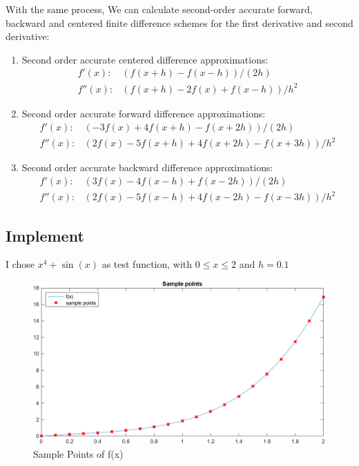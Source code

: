 \documentclass[
	12pt, %
]{fphw}
\numberwithin{equation}{section}
\numberwithin{figure}{section}
\numberwithin{table}{section}
\begin{document}
With the same process, We can calculate second-order accurate forward, backward and centered finite difference
schemes for the first derivative and second derivative:
\begin{enumerate}
	\item Second order accurate centered difference approximations:
	      \begin{equation}
		      \begin{aligned}
			      f' (x):  & (f (x+h)-f (x-h)) /(2 h)        \\
			      f'' (x): & (f (x+h)-2 f (x)+f (x-h)) / h^2
		      \end{aligned}
	      \end{equation}
	\item Second order accurate forward difference approximations:
	      \begin{equation}
		      \begin{aligned}
			      f' (x):  & (-3 f (x)+4 f (x+h)-f (x+2 h)) / (2 h)          \\
			      f'' (x): & (2 f (x)-5 f (x+h)+4 f (x+2 h)-f (x+3 h)) / h^2
		      \end{aligned}
	      \end{equation}
	\item Second order accurate backward difference approximations:
	      \begin{equation}
		      \begin{aligned}
			      f' (x):  & (3 f (x)-4 f (x-h)+f (x-2 h)) / (2 h)           \\
			      f'' (x): & (2 f (x)-5 f (x-h)+4 f (x-2 h)-f (x-3 h)) / h^2
		      \end{aligned}
	      \end{equation}
\end{enumerate}

\subsection*{Implement}

I chose $x^4+\sin(x)$ as test function, with $0\leq x \leq 2$ and $h=0.1$

\begin{figure}[h!]
	\centering
	\includegraphics[width=0.8\columnwidth]{img/sample_points.png} 
	\caption{Sample Points of f(x)}
	\label{fig:sample_points}
\end{figure}
\end{document}
